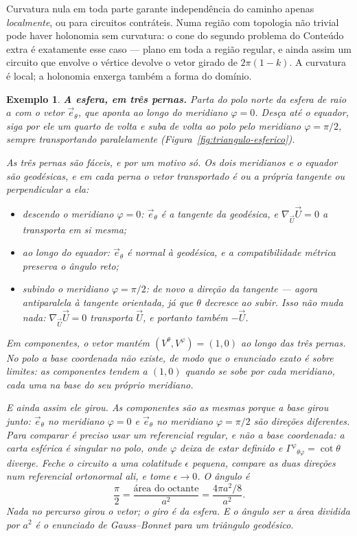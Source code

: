\documentclass[12pt,a4paper,oneside]{book}
\theoremstyle{rgplain}
\newtheorem{example}{Exemplo}[chapter]
\theoremstyle{rgremark}
\begin{document}
\begin{atencao}
Curvatura nula em toda parte garante independência do caminho apenas
\emph{localmente}, ou para circuitos contráteis. Numa região com topologia
não trivial pode haver holonomia sem curvatura: o cone do segundo problema
do Conteúdo extra é exatamente esse caso --- plano em toda a região regular,
e ainda assim um circuito que envolve o vértice devolve o vetor girado de
$2\pi(1-k)$. A curvatura é local; a holonomia enxerga também a forma do
domínio.
\end{atencao}

\begin{example}
\label{ex:triangulo-esferico}
\textbf{A esfera, em três pernas.} Parta do polo norte da esfera de raio $a$
com o vetor $\vec e_\theta$, que aponta ao longo do meridiano $\varphi=0$.
Desça até o equador, siga por ele um quarto de volta e suba de volta ao polo
pelo meridiano $\varphi=\pi/2$, sempre transportando paralelamente
(Figura~\ref{fig:triangulo-esferico}).

\emph{As três pernas são fáceis, e por um motivo só.} Os dois meridianos e o
equador são geodésicas, e em cada perna o vetor transportado é ou a própria
tangente ou perpendicular a ela:
\begin{itemize}
  \item \emph{descendo o meridiano $\varphi=0$}: $\vec e_\theta$ é a
  tangente da geodésica, e $\nabla_{\vec U}\vec U=0$ a transporta em si
  mesma;
  \item \emph{ao longo do equador}: $\vec e_\theta$ é normal à geodésica, e
  a compatibilidade métrica preserva o ângulo reto;
  \item \emph{subindo o meridiano $\varphi=\pi/2$}: de novo a direção da
  tangente --- agora \emph{antiparalela} à tangente orientada, já que $\theta$
  decresce ao subir. Isso não muda nada: $\nabla_{\vec U}\vec U=0$ transporta
  $\vec U$, e portanto também $-\vec U$.
\end{itemize}
Em componentes, o vetor mantém $(V^\theta,V^\varphi)=(1,0)$ ao longo das três
pernas. No polo a base coordenada não existe, de modo que o enunciado exato é
sobre \emph{limites}: as componentes tendem a $(1,0)$ quando se sobe por cada
meridiano, cada uma na base do seu próprio meridiano.

\emph{E ainda assim ele girou.} As componentes são as mesmas porque a
\emph{base} girou junto: $\vec e_\theta$ no meridiano $\varphi=0$ e
$\vec e_\theta$ no meridiano $\varphi=\pi/2$ são direções diferentes. Para
comparar é preciso usar um referencial \emph{regular}, e não a base
coordenada: a carta esférica é singular no polo, onde $\varphi$ deixa de estar
definido e $\Gamma^\varphi{}_{\theta\varphi}=\cot\theta$ diverge. Feche o
circuito a uma colatitude $\epsilon$ pequena, compare as duas direções num
referencial ortonormal ali, e tome $\epsilon\to0$. O ângulo é
\[
  \frac{\pi}{2}
  =\frac{\text{área do octante}}{a^2}
  =\frac{4\pi a^2/8}{a^2} .
\]
Nada no percurso girou o vetor; o giro é da esfera. E o ângulo ser a área
dividida por $a^2$ é o enunciado de Gauss--Bonnet para um triângulo
geodésico.
\end{example}
\end{document}

